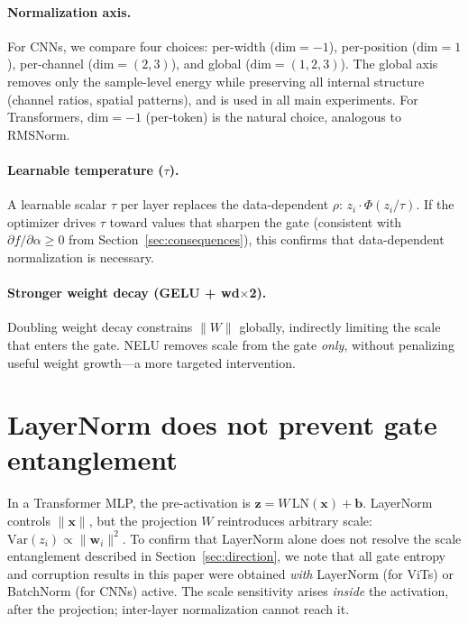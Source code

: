 \paragraph{Normalization axis.}
For CNNs, we compare four choices: per-width ($\mathrm{dim}{=}{-}1$), per-position ($\mathrm{dim}{=}1$), per-channel ($\mathrm{dim}{=}(2{,}3)$), and global ($\mathrm{dim}{=}(1{,}2{,}3)$).
The global axis removes only the sample-level energy while preserving all internal structure (channel ratios, spatial patterns), and is used in all main experiments.
For Transformers, $\mathrm{dim}{=}{-}1$ (per-token) is the natural choice, analogous to RMSNorm.

\paragraph{Learnable temperature ($\tau$).}
A learnable scalar $\tau$ per layer replaces the data-dependent $\rho$: $z_i \cdot \Phi(z_i / \tau)$.
If the optimizer drives $\tau$ toward values that sharpen the gate (consistent with $\partial f/\partial\alpha \geq 0$ from Section~\ref{sec:consequences}), this confirms that data-dependent normalization is necessary.

\paragraph{Stronger weight decay (GELU + wd$\times$2).}
Doubling weight decay constrains $\|W\|$ globally, indirectly limiting the scale that enters the gate.
NELU removes scale from the gate \emph{only}, without penalizing useful weight growth---a more targeted intervention.


\section{LayerNorm does not prevent gate entanglement}\label{app:ln_ablation}

In a Transformer MLP, the pre-activation is $\mathbf{z} = W\,\mathrm{LN}(\mathbf{x}) + \mathbf{b}$.
LayerNorm controls $\|\mathbf{x}\|$, but the projection $W$ reintroduces arbitrary scale: $\mathrm{Var}(z_i) \propto \|\mathbf{w}_i\|^2$.
To confirm that LayerNorm alone does not resolve the scale entanglement described in Section~\ref{sec:direction}, we note that all gate entropy and corruption results in this paper were obtained \emph{with} LayerNorm (for ViTs) or BatchNorm (for CNNs) active.
The scale sensitivity arises \emph{inside} the activation, after the projection; inter-layer normalization cannot reach it.


